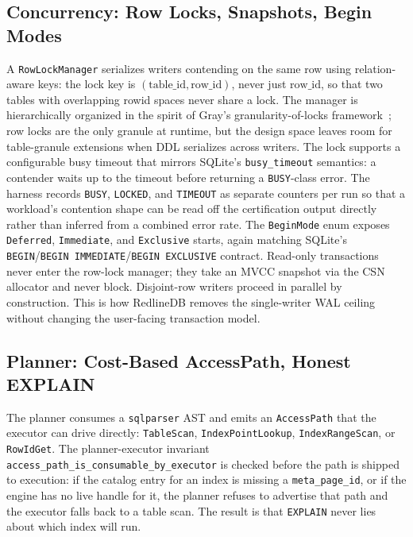 \subsection{Concurrency: Row Locks, Snapshots, Begin Modes}
A \texttt{RowLockManager} serializes writers contending on the same
row using relation-aware keys: the lock key is
$(\mathrm{table\_id}, \mathrm{row\_id})$, never just $\mathrm{row\_id}$, so
that two tables with overlapping rowid spaces never share a lock. The
manager is hierarchically organized in the spirit of Gray's
granularity-of-locks framework~\cite{gray1976granularity}; row locks
are the only granule at runtime, but the design space leaves room
for table-granule extensions when DDL serializes across writers.
The lock supports a configurable busy timeout that mirrors SQLite's
\texttt{busy\_timeout} semantics: a contender waits up to the timeout
before returning a \texttt{BUSY}-class error. The harness records
\texttt{BUSY}, \texttt{LOCKED}, and \texttt{TIMEOUT} as separate
counters per run so that a workload's contention shape can be read
off the certification output directly rather than inferred from a
combined error rate. The
\texttt{BeginMode} enum exposes \texttt{Deferred}, \texttt{Immediate},
and \texttt{Exclusive} starts, again matching SQLite's
\texttt{BEGIN}/\texttt{BEGIN IMMEDIATE}/\texttt{BEGIN EXCLUSIVE}
contract. Read-only transactions never enter the row-lock manager;
they take an MVCC snapshot via the CSN allocator and never block.
Disjoint-row writers proceed in parallel by construction. This is
how RedlineDB removes the single-writer WAL ceiling without changing
the user-facing transaction model.

\subsection{Planner: Cost-Based AccessPath, Honest EXPLAIN}
The planner consumes a \texttt{sqlparser} AST and emits an
\texttt{AccessPath} that the executor can drive directly:
\texttt{TableScan}, \texttt{IndexPointLookup}, \texttt{IndexRangeScan},
or \texttt{RowIdGet}. The planner-executor invariant
\texttt{access\_path\_is\_consumable\_by\_executor} is checked
before the path is shipped to execution: if the catalog entry for an
index is missing a \texttt{meta\_page\_id}, or if the engine has no
live handle for it, the planner refuses to advertise that path and
the executor falls back to a table scan. The result is that
\texttt{EXPLAIN} never lies about which index will run.

